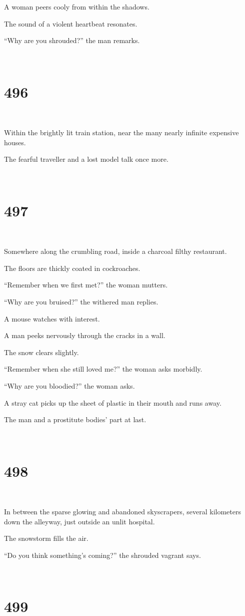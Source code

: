 \documentclass{report}
\begin{document}
A woman peers cooly from within the shadows.

The sound of a violent heartbeat resonates.

``Why are you shrouded?'' the man remarks.

~
\chapter*{496}
~

Within the brightly lit train station, near the many nearly infinite expensive houses.

The fearful traveller and a lost model talk once more.

~
\chapter*{497}
~

Somewhere along the crumbling road, inside a charcoal filthy restaurant.

The floors are thickly coated in cockroaches.

``Remember when we first met?'' the woman mutters.

``Why are you bruised?'' the withered man replies.

A mouse watches with interest.

A man peeks nervously through the cracks in a wall.

The snow clears slightly.

``Remember when she still loved me?'' the woman asks morbidly.

``Why are you bloodied?'' the woman asks.

A stray cat picks up the sheet of plastic in their mouth and runs away.

The man and a prostitute bodies' part at last.

~
\chapter*{498}
~

In between the sparse glowing and abandoned skyscrapers, several kilometers down the alleyway, just outside an unlit hospital.

The snowstorm fills the air.

``Do you think something's coming?'' the shrouded vagrant says.

~
\chapter*{499}
~
\end{document}
